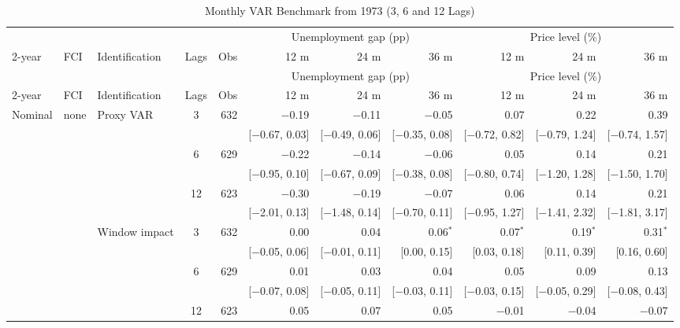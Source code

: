 \begingroup\scriptsize\setlength{\tabcolsep}{0.9pt}
\begin{longtable}{lllcrrrrrrr}
\caption{Monthly VAR Benchmark from 1973 (3, 6 and 12 Lags)}\label{tab:appmonthly73}\\
\toprule
 & & & & & \multicolumn{3}{c}{Unemployment gap (pp)} & \multicolumn{3}{c}{Price level (\%)}\\ \cmidrule(lr){6-8}\cmidrule(lr){9-11}
2-year & FCI & Identification & Lags & Obs & 12 m & 24 m & 36 m & 12 m & 24 m & 36 m\\
\midrule\endfirsthead
\toprule
 & & & & & \multicolumn{3}{c}{Unemployment gap (pp)} & \multicolumn{3}{c}{Price level (\%)}\\ \cmidrule(lr){6-8}\cmidrule(lr){9-11}
2-year & FCI & Identification & Lags & Obs & 12 m & 24 m & 36 m & 12 m & 24 m & 36 m\\
\midrule\endhead
\bottomrule\endfoot
Nominal & none & Proxy VAR & 3 & 632 & $-$0.19 & $-$0.11 & $-$0.05 & 0.07 & 0.22 & 0.39\\
 & & & & & {\tiny [$-$0.67, 0.03]} & {\tiny [$-$0.49, 0.06]} & {\tiny [$-$0.35, 0.08]} & {\tiny [$-$0.72, 0.82]} & {\tiny [$-$0.79, 1.24]} & {\tiny [$-$0.74, 1.57]}\\
 &  &  & 6 & 629 & $-$0.22 & $-$0.14 & $-$0.06 & 0.05 & 0.14 & 0.21\\
 & & & & & {\tiny [$-$0.95, 0.10]} & {\tiny [$-$0.67, 0.09]} & {\tiny [$-$0.38, 0.08]} & {\tiny [$-$0.80, 0.74]} & {\tiny [$-$1.20, 1.28]} & {\tiny [$-$1.50, 1.70]}\\
 &  &  & 12 & 623 & $-$0.30 & $-$0.19 & $-$0.07 & 0.06 & 0.14 & 0.21\\
 & & & & & {\tiny [$-$2.01, 0.13]} & {\tiny [$-$1.48, 0.14]} & {\tiny [$-$0.70, 0.11]} & {\tiny [$-$0.95, 1.27]} & {\tiny [$-$1.41, 2.32]} & {\tiny [$-$1.81, 3.17]}\\
 &  & Window impact & 3 & 632 & 0.00 & 0.04 & 0.06$^{*}$ & 0.07$^{*}$ & 0.19$^{*}$ & 0.31$^{*}$\\
 & & & & & {\tiny [$-$0.05, 0.06]} & {\tiny [$-$0.01, 0.11]} & {\tiny [0.00, 0.15]} & {\tiny [0.03, 0.18]} & {\tiny [0.11, 0.39]} & {\tiny [0.16, 0.60]}\\
 &  &  & 6 & 629 & 0.01 & 0.03 & 0.04 & 0.05 & 0.09 & 0.13\\
 & & & & & {\tiny [$-$0.07, 0.08]} & {\tiny [$-$0.05, 0.11]} & {\tiny [$-$0.03, 0.11]} & {\tiny [$-$0.03, 0.15]} & {\tiny [$-$0.05, 0.29]} & {\tiny [$-$0.08, 0.43]}\\
 &  &  & 12 & 623 & 0.05 & 0.07 & 0.05 & $-$0.01 & $-$0.04 & $-$0.07\\

\end{longtable}
